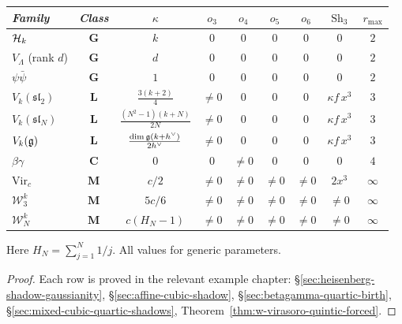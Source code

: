 \begin{theorem}
\label{thm:thqg-obstruction-table}
\ClaimStatusProvedHere
{}
\begin{center}
\footnotesize
\renewcommand{\arraystretch}{1.4}
\begin{tabular}{l@{\;\;}c@{\;\;}c@{\;\;}c@{\;\;}c@{\;\;}c@{\;\;}c@{\;\;}c@{\;\;}c}
\toprule
\emph{Family} & \emph{Class} & $\kappa$ &
 $o_3$ & $o_4$ & $o_5$ & $o_6$ &
 $\mathrm{Sh}_3$ & $r_{\max}$ \\
\midrule
$\mathcal{H}_k$ &
 $\mathbf{G}$ & $k$ &
 $0$ & $0$ & $0$ & $0$ & $0$ & $2$ \\
$V_\Lambda$ (rank $d$) &
 $\mathbf{G}$ & $d$ &
 $0$ & $0$ & $0$ & $0$ & $0$ & $2$ \\
$\psi\bar\psi$ &
 $\mathbf{G}$ & $1$ &
 $0$ & $0$ & $0$ & $0$ & $0$ & $2$ \\[2pt]
$V_k(\mathfrak{sl}_2)$ &
 $\mathbf{L}$ & $\frac{3(k+2)}{4}$ &
 $\neq 0$ & $0$ & $0$ & $0$ &
 $\kappa f\,x^3$ & $3$ \\
$V_k(\mathfrak{sl}_N)$ &
 $\mathbf{L}$ & $\frac{(N^2{-}1)(k+N)}{2N}$ &
 $\neq 0$ & $0$ & $0$ & $0$ &
 $\kappa f\,x^3$ & $3$ \\
$V_k(\mathfrak{g})$ &
 $\mathbf{L}$ & $\frac{\dim\mathfrak{g}(k+h^\vee)}{2h^\vee}$ &
 $\neq 0$ & $0$ & $0$ & $0$ &
 $\kappa f\,x^3$ & $3$ \\[2pt]
$\beta\gamma$ &
 $\mathbf{C}$ & $0$ &
 $0$ & $\neq 0$ & $0$ & $0$ &
 $0$ & $4$ \\[2pt]
$\mathrm{Vir}_c$ &
 $\mathbf{M}$ & $c/2$ &
 $\neq 0$ & $\neq 0$ & $\neq 0$ & $\neq 0$ &
 $2x^3$ & $\infty$ \\
$\mathcal{W}_3^k$ &
 $\mathbf{M}$ & $5c/6$ &
 $\neq 0$ & $\neq 0$ & $\neq 0$ & $\neq 0$ &
 $\neq 0$ & $\infty$ \\
$\mathcal{W}_N^k$ &
 $\mathbf{M}$ & $c(H_N{-}1)$ &
 $\neq 0$ & $\neq 0$ & $\neq 0$ & $\neq 0$ &
 $\neq 0$ & $\infty$ \\
\bottomrule
\end{tabular}
\end{center}
Here $H_N = \sum_{j=1}^N 1/j$. All values for generic parameters.
\end{theorem}

\begin{proof}
Each row is proved in the relevant example chapter:
\S\ref{sec:heisenberg-shadow-gaussianity},
\S\ref{sec:affine-cubic-shadow},
\S\ref{sec:betagamma-quartic-birth},
\S\ref{sec:mixed-cubic-quartic-shadows},
Theorem~\ref{thm:w-virasoro-quintic-forced}.
\end{proof}


